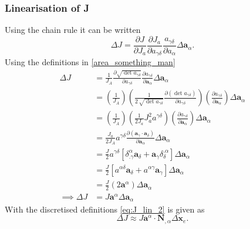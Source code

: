 \documentclass[../main.tex]{subfiles}
\begin{document}
\begin{appendices}
\subsubsection{Linearisation of J}
Using the chain rule it can be written 
\begin{equation}\label{eq:J_lin_1}
    \Delta J = \frac{\partial J}{\partial J_{a}} \frac{\partial J_{a}}{\partial a_{\gamma \delta}} \frac{a_{\gamma \delta}}{\partial a_{\alpha}} \Delta \boldsymbol{a}_{\alpha}.
\end{equation}
Using the definitions in \eqref{area_something_man}
\begin{equation} \label{eq:J_lin_2}
    \begin{split}
        \Delta J &= \frac{1}{J_{A}} \frac{\partial \sqrt{\det a_{\gamma \delta}}}{\partial a_{\gamma \delta}} \frac{\partial a_{\gamma \delta}}{\partial \boldsymbol{a}_{\alpha}} \Delta \boldsymbol{a}_{\alpha} \\
        & = \left(\frac{1}{J_{A}}\right) \left(\frac{1}{2\,\sqrt{\det a_{\gamma \delta}}} \frac{\partial \left(\det a_{\gamma \delta}\right)}{\partial a_{\gamma \delta}}\right) \left(\frac{\partial a_{\gamma \delta}}{\partial \boldsymbol{a}_{\alpha}}\right) \Delta \boldsymbol{a}_{\alpha} \\
        & = \left(\frac{1}{J_{A}}\right) \left(\frac{1}{2 J_{a}} J_{a}^{2} a^{\gamma \delta}\right) \left(\frac{\partial a_{\gamma \delta}}{\partial \boldsymbol{a}_{\alpha}}\right) \Delta \boldsymbol{a}_{\alpha} \\
        & = \frac{J_{a}}{2 J_{A}} a^{\gamma \delta} \frac{\partial \left(\boldsymbol{a}_{\gamma} \cdot \boldsymbol{a}_{\delta}\right)}{\partial \boldsymbol{a}_{\alpha}} \Delta \boldsymbol{a}_{\alpha}\\
        & = \frac{J}{2} a^{\gamma \delta} \left[\delta^{\alpha}_{.\gamma} \boldsymbol{a}_{\delta} + \boldsymbol{a}_{\gamma} \delta_{\delta}^{.\alpha}\right] \Delta \boldsymbol{a}_{\alpha}\\
        & = \frac{J}{2} \left[a^{\alpha \delta} \boldsymbol{a}_{\delta} + a^{\alpha \gamma} \boldsymbol{a}_{\gamma}\right] \Delta \boldsymbol{a}_{\alpha}\\
        & = \frac{J}{2}\left(2 \boldsymbol{a}^{\alpha}\right) \Delta \boldsymbol{a}_{\alpha}\\
        \implies \Delta J & = J \boldsymbol{a}^{\alpha} \Delta \boldsymbol{a}_{\alpha}
    \end{split}
\end{equation}
With the discretised definitions \eqref{eq:J_lin_2} is given as
\begin{equation}\label{eq:J_lin_3}
    \Delta J \approx J \boldsymbol{a}^{\alpha} \cdot \mathbf{N}_{,\alpha} \Delta \mathbf{x}_{e}.
\end{equation}


\end{appendices}
\end{document}
